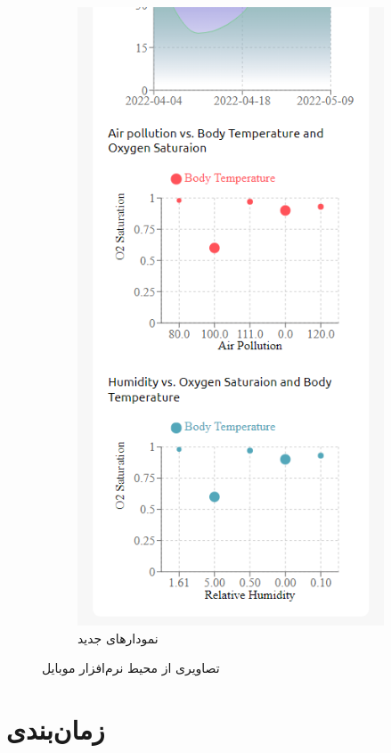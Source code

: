 \documentclass[12pt]{article}
\begin{document}
\begin{figure}
\begin{center}
\begin{subfigure}{.3\textwidth}
			\includegraphics[width=.9\linewidth]{app_charts2}
			\caption{نمودارهای جدید}
			\label{new_charts}
		\end{subfigure}
		\caption{تصاویری از محیط نرم‌افزار موبایل}
		\label{app_screenshots}
	\end{center}
\end{figure}

\newpage
\section{زمان‌بندی} \label{gantt}
\end{document}

